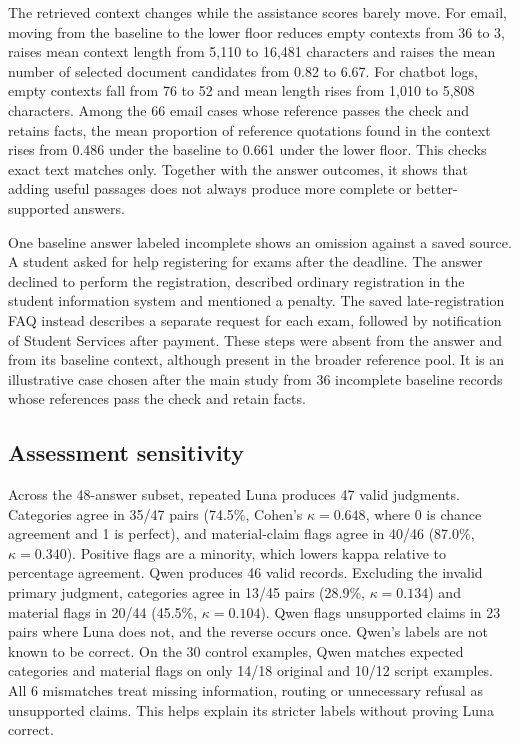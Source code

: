 \documentclass[a4paper,10pt,twocolumn]{article}
\begin{document}
The retrieved context changes while the assistance scores barely move. For email, moving from the baseline to the lower floor reduces empty contexts from 36 to 3, raises mean context length from 5,110 to 16,481 characters and raises the mean number of selected document candidates from 0.82 to 6.67. For chatbot logs, empty contexts fall from 76 to 52 and mean length rises from 1,010 to 5,808 characters. Among the 66 email cases whose reference passes the check and retains facts, the mean proportion of reference quotations found in the context rises from 0.486 under the baseline to 0.661 under the lower floor. This checks exact text matches only. Together with the answer outcomes, it shows that adding useful passages does not always produce more complete or better-supported answers.

One baseline answer labeled incomplete shows an omission against a saved source. A student asked for help registering for exams after the deadline. The answer declined to perform the registration, described ordinary registration in the student information system and mentioned a penalty. The saved late-registration FAQ instead describes a separate request for each exam, followed by notification of Student Services after payment. These steps were absent from the answer and from its baseline context, although present in the broader reference pool. It is an illustrative case chosen after the main study from 36 incomplete baseline records whose references pass the check and retain facts.
\subsection{Assessment sensitivity}
Across the 48-answer subset, repeated Luna produces 47 valid judgments. Categories agree in 35/47 pairs (74.5\%, Cohen's $\kappa=0.648$, where 0 is chance agreement and 1 is perfect), and material-claim flags agree in 40/46 (87.0\%, $\kappa=0.340$). Positive flags are a minority, which lowers kappa relative to percentage agreement. Qwen produces 46 valid records. Excluding the invalid primary judgment, categories agree in 13/45 pairs (28.9\%, $\kappa=0.134$) and material flags in 20/44 (45.5\%, $\kappa=0.104$). Qwen flags unsupported claims in 23 pairs where Luna does not, and the reverse occurs once. Qwen's labels are not known to be correct. On the 30 control examples, Qwen matches expected categories and material flags on only 14/18 original and 10/12 script examples. All 6 mismatches treat missing information, routing or unnecessary refusal as unsupported claims. This helps explain its stricter labels without proving Luna correct.
\end{document}
